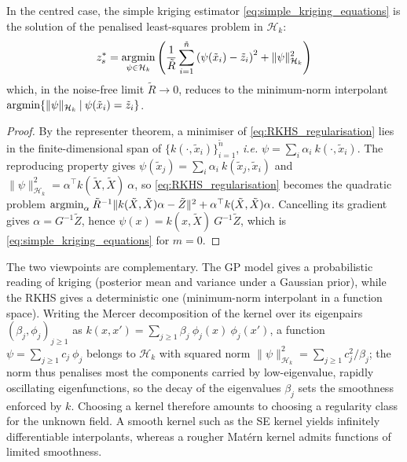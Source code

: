 \begin{proposition}\label{th:RKHS_kriging}
	In the centred case, the simple kriging estimator \eqref{eq:simple_kriging_equations} is the solution of the penalised least-squares problem in $\mathcal{H}_k$:
	\begin{equation}
		z_s^*=\underset{\psi\in\mathcal{H}_k}{\textup{argmin}}\left(\frac{1}{\tilde{R}}\sum_{i=1}^{\tilde{n}}\left(\psi(\tilde{x}_i)-\tilde{z}_i\right)^2+\|\psi\|_{\mathcal{H}_k}^2\right)\label{eq:RKHS_regularisation}
	\end{equation}
	which, in the noise-free limit $\tilde{R}\to0$, reduces to the minimum-norm interpolant $\textup{argmin}\{\|\psi\|_{\mathcal{H}_k}\:|\:\psi(\tilde{x}_i)=\tilde{z}_i\}$.
\end{proposition}

\begin{proof}
	By the representer theorem, a minimiser of \eqref{eq:RKHS_regularisation} lies in the finite-dimensional span of $\{k(\cdot,\tilde{x}_i)\}_{i=1}^{\tilde{n}}$, \textit{i.e.} $\psi=\sum_i\alpha_i\:k(\cdot,\tilde{x}_i)$. The reproducing property gives $\psi(\tilde{x}_j)=\sum_i\alpha_i\:k(\tilde{x}_j,\tilde{x}_i)$ and $\|\psi\|_{\mathcal{H}_k}^2=\alpha^\top k(\tilde{X},\tilde{X})\:\alpha$, so \eqref{eq:RKHS_regularisation} becomes the quadratic problem $\textup{argmin}_\alpha\:\tilde{R}^{-1}\|k(\tilde{X},\tilde{X})\alpha-\tilde{Z}\|^2+\alpha^\top k(\tilde{X},\tilde{X})\alpha$. Cancelling its gradient gives $\alpha=G^{-1}\tilde{Z}$, hence $\psi(x)=k(x,\tilde{X})\:G^{-1}\tilde{Z}$, which is \eqref{eq:simple_kriging_equations} for $m=0$.
\end{proof}

\begin{remark}
	The two viewpoints are complementary. The GP model gives a probabilistic reading of kriging (posterior mean and variance under a Gaussian prior), while the RKHS gives a deterministic one (minimum-norm interpolant in a function space). Writing the Mercer decomposition of the kernel over its eigenpairs $(\beta_j,\phi_j)_{j\geq1}$ as $k(x,x')=\sum_{j\geq1}\beta_j\:\phi_j(x)\:\phi_j(x')$, a function $\psi=\sum_{j\geq1}c_j\:\phi_j$ belongs to $\mathcal{H}_k$ with squared norm $\|\psi\|_{\mathcal{H}_k}^2=\sum_{j\geq1}c_j^2/\beta_j$; the norm thus penalises most the components carried by low-eigenvalue, rapidly oscillating eigenfunctions, so the decay of the eigenvalues $\beta_j$ sets the smoothness enforced by $k$. Choosing a kernel therefore amounts to choosing a regularity class for the unknown field. A smooth kernel such as the SE kernel yields infinitely differentiable interpolants, whereas a rougher Matérn kernel admits functions of limited smoothness.
\end{remark}
